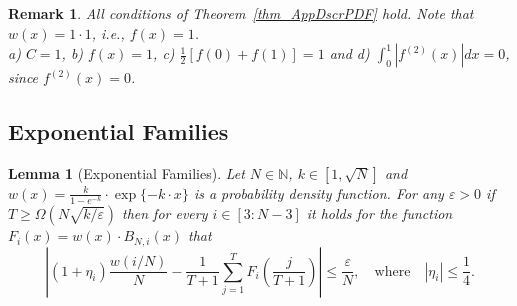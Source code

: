 \documentclass[11pt]{article}
\newcommand{\N}{\mathbb{N}}
\newcommand{\eps}{\epsilon}
\renewcommand{\leq}{\leqslant}
\renewcommand{\geq}{\geqslant}
\renewcommand{\eps}{\varepsilon}
\newtheorem{lem}[thm]{Lemma}
\newtheorem{rem}[thm]{Remark}
\numberwithin{thm}{section}
\begin{document}
\begin{rem}
All conditions of Theorem~\ref{thm_AppDscrPDF} hold. Note that $w(x)=1\cdot 1$, i.e., $f(x)=1$.\\
a) $C=1$, b) $f(x)=1$, c) $\frac{1}{2}[f(0)+f(1)]=1$ and d) $\int_{0}^{1}|f^{(2)}(x)|dx=0$, since $f^{(2)}(x)=0$.
\end{rem}


\subsection{Exponential Families}

\begin{lem}[Exponential Families]\label{lem_approxExpFam}
Let $N\in\N$, $k\in[1,\sqrt{N}]$ and $w(x)=\frac{k}{1-e^{-k}}\cdot\exp\{ -k\cdot x\}$
is a probability density function. For any $\eps>0$ if $T\geq\Omega(N\sqrt{k/\eps})$ then for every $i\in[3:N-3]$ it holds for the function
$F_{i}(x)=w(x)\cdot B_{N,i}(x)$ that
\[
\left|(1+\eta_{i})\frac{w(i/N)}{N}-\frac{1}{T+1}\sum_{j=1}^{T}F_{i}\left(\frac{j}{T+1}\right)\right|\leq\frac{\eps}{N},\quad\text{where}\quad\left|\eta_{i}\right|\leq\frac{1}{4}.
\]
\end{lem}
\end{document}
